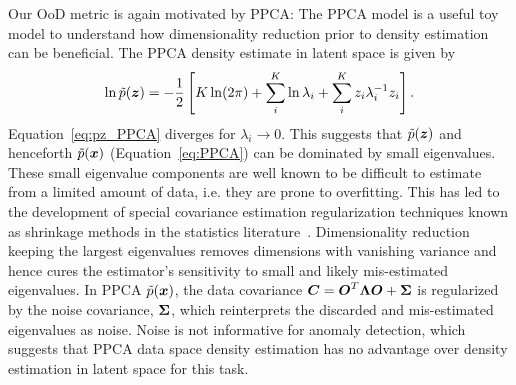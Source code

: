 \documentclass[10pt]{article} \usepackage[accepted]{tmlr}
\def\bi#1{\hbox{\boldmath{$#1$}}}
\newcommand{\rev}[1]{{\color{black}#1}}
\begin{document}
Our OoD metric is again motivated by PPCA:
The PPCA model is a useful toy model to understand how dimensionality reduction prior to density estimation can be beneficial. The PPCA density estimate in latent space is given by
\begin{equation}
\label{eq:pz_PPCA}
    \ln \tilde{p}(\bi z) = -\frac{1}{2}\left[K \ln(2\pi)+\sum^K_i \ln \lambda_i + \sum_i^K z_i \lambda_i^{-1} z_i \right].
\end{equation}
Equation~\ref{eq:pz_PPCA} diverges 
for $\lambda_i \rightarrow 0$. This suggests that $\tilde{p}(\bi z)$ and henceforth $\tilde p(\bi x)$ (Equation~\ref{eq:PPCA}) can be dominated by small eigenvalues. \rev{These small eigenvalue components are well known to be difficult to estimate from a limited amount of data, i.e. they are prone to overfitting. This has led to the development of special covariance estimation regularization techniques known as shrinkage methods in the statistics literature~\citep{ChenOAS,LedoitWolf2004}.}
Dimensionality reduction keeping the largest eigenvalues removes dimensions with vanishing variance and hence cures the estimator's sensitivity to small \rev{and likely mis-estimated eigenvalues}.  In \rev{PPCA} $\tilde p(\bi{x})$, the data covariance $\bi C = \bi{O}^T \bi \Lambda \bi O + \bi \Sigma$ is regularized by the noise covariance, $\bi \Sigma$, \rev{which reinterprets the discarded  and mis-estimated eigenvalues as noise}. \rev{Noise is not informative for anomaly detection, which suggests that PPCA data space density estimation has no advantage over density estimation in latent space for this task.}
\end{document}
